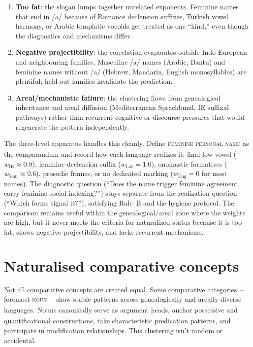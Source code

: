 \documentclass[12pt]{article}
\begin{document}
\begin{enumerate}[label=(\roman*), leftmargin=*]
    \item \textbf{Too fat}: the slogan lumps together unrelated exponents. Feminine names that end in /a/ because of Romance declension suffixes, Turkish vowel harmony, or Arabic templatic vocoids get treated as one “kind,” even though the diagnostics and mechanisms differ.
    \item \textbf{Negative projectibility}: the correlation evaporates outside Indo-European and neighbouring families. Masculine /a/ names (Arabic, Bantu) and feminine names without /a/ (Hebrew, Mandarin, English monosyllables) are plentiful; held-out families invalidate the prediction.
    \item \textbf{Areal/mechanistic failure}: the clustering flows from genealogical inheritance and areal diffusion (Mediterranean Sprachbund, IE suffixal pathways) rather than recurrent cognitive or discourse pressures that would regenerate the pattern independently.
\end{enumerate}

The three-level apparatus handles this cleanly. Define \textsc{feminine personal name}\textsubscript{\Cross} as the comparandum and record how each language realizes it: final low vowel ($w_{\mathrm{IE}} \approx 0.8$), feminine declension suffix ($w_{\mathrm{Lat}} = 1.0$), onomastic formatives ($w_{\mathrm{Sem}} \approx 0.6$), prosodic frames, or no dedicated marking ($w_{\mathrm{Eng}} = 0$ for most names). The diagnostic question (\enquote{Does the name trigger feminine agreement, carry feminine social indexing?}) stays separate from the realization question (\enquote{Which forms signal it?}), satisfying Rule~B and the hygiene protocol. The comparison remains useful within the genealogical/areal zone where the weights are high, but it never meets the criteria for naturalized status because it is too fat, shows negative projectibility, and lacks recurrent mechanisms.

\section{Naturalised comparative concepts}\label{sec:naturalized}
Not all comparative concepts are created equal. Some comparative categories~-- foremost \textsc{noun}\textsubscript{\Cross}~-- show stable patterns across genealogically and areally diverse languages. Nouns\textsubscript{\Cross} canonically serve as argument heads, anchor possessive and quantificational constructions, take characteristic predication patterns, and participate in modification relationships. This clustering isn't random or accidental.
\end{document}
